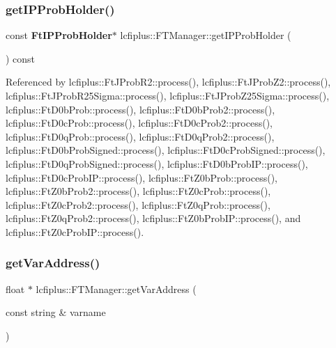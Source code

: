 \mbox{\label{classlcfiplus_1_1FTManager_a78adde7b0b9e8798493c2e2d7f5dc419}} 
\subsubsection{get\+I\+P\+Prob\+Holder()}
{\footnotesize\ttfamily const \textbf{ Ft\+I\+P\+Prob\+Holder}$\ast$ lcfiplus\+::\+F\+T\+Manager\+::get\+I\+P\+Prob\+Holder (\begin{DoxyParamCaption}{ }\end{DoxyParamCaption}) const\hspace{0.3cm}{\ttfamily [inline]}}



Referenced by lcfiplus\+::\+Ft\+J\+Prob\+R2\+::process(), lcfiplus\+::\+Ft\+J\+Prob\+Z2\+::process(), lcfiplus\+::\+Ft\+J\+Prob\+R25\+Sigma\+::process(), lcfiplus\+::\+Ft\+J\+Prob\+Z25\+Sigma\+::process(), lcfiplus\+::\+Ft\+D0b\+Prob\+::process(), lcfiplus\+::\+Ft\+D0b\+Prob2\+::process(), lcfiplus\+::\+Ft\+D0c\+Prob\+::process(), lcfiplus\+::\+Ft\+D0c\+Prob2\+::process(), lcfiplus\+::\+Ft\+D0q\+Prob\+::process(), lcfiplus\+::\+Ft\+D0q\+Prob2\+::process(), lcfiplus\+::\+Ft\+D0b\+Prob\+Signed\+::process(), lcfiplus\+::\+Ft\+D0c\+Prob\+Signed\+::process(), lcfiplus\+::\+Ft\+D0q\+Prob\+Signed\+::process(), lcfiplus\+::\+Ft\+D0b\+Prob\+I\+P\+::process(), lcfiplus\+::\+Ft\+D0c\+Prob\+I\+P\+::process(), lcfiplus\+::\+Ft\+Z0b\+Prob\+::process(), lcfiplus\+::\+Ft\+Z0b\+Prob2\+::process(), lcfiplus\+::\+Ft\+Z0c\+Prob\+::process(), lcfiplus\+::\+Ft\+Z0c\+Prob2\+::process(), lcfiplus\+::\+Ft\+Z0q\+Prob\+::process(), lcfiplus\+::\+Ft\+Z0q\+Prob2\+::process(), lcfiplus\+::\+Ft\+Z0b\+Prob\+I\+P\+::process(), and lcfiplus\+::\+Ft\+Z0c\+Prob\+I\+P\+::process().

\mbox{\label{classlcfiplus_1_1FTManager_a62ddf44a37554417ce3b31a9f7771cd9}} 
\subsubsection{get\+Var\+Address()}
{\footnotesize\ttfamily float $\ast$ lcfiplus\+::\+F\+T\+Manager\+::get\+Var\+Address (\begin{DoxyParamCaption}\item[{const string \&}]{varname }\end{DoxyParamCaption})}



